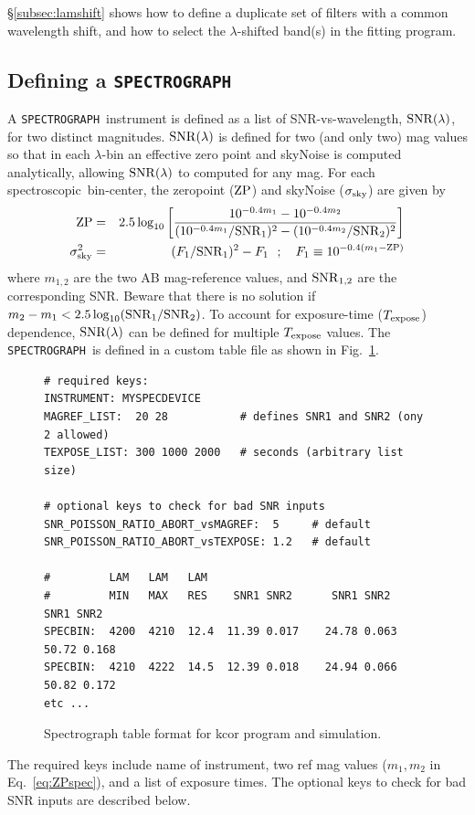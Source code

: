 \documentclass[12pt]{article}
\newcommand{\SPEC}{{\tt SPECTROGRAPH}}
\newcommand{\SNRlam}{{\rm SNR}(\lambda)}
\newcommand{\Texpose}{T_{\rm expose}}
\newcommand{\ZP}{{\rm ZP}}
\newcommand{\sigSky}{\sigma_{\rm sky}}
\newcommand{\spec}{spectroscopic}
\newcommand{\lam}{\lambda}
\begin{document}
{\S\ref{subsec:lamshift} shows how to define a duplicate set
of filters with a common wavelength shift, and how to select
the $\lambda$-shifted band(s) in the fitting program.


 \clearpage
\subsection{Defining a {\SPEC} }
\label{subsec:kcor_spectrograph}


A \SPEC\ instrument is defined as a list of SNR-vs-wavelength,
$\SNRlam$, for two distinct magnitudes. 
$\SNRlam$ is defined for two (and only two) mag values so that in each
$\lam$-bin an effective zero point and skyNoise is 
computed analytically, allowing $\SNRlam$ to computed for any mag.
For each \spec\ bin-center, the zeropoint ($\ZP$) and skyNoise ($\sigSky$) 
are given by
%
\begin{eqnarray}
   \ZP & = &
      2.5\log_{10}\left[ \frac{  10^{-0.4m_1} - 10^{-0.4m_2} }
           {  (10^{-0.4m_1}/{\rm SNR}_1)^2 - (10^{-0.4m_2}/{\rm SNR}_2)^2 }
      \right]
     \\
   \sigSky^2 & = & (F_1/{\rm SNR}_1)^2 - F_1 ~~ ; ~~~ 
            F_1 \equiv 10^{-0.4(m_1-\ZP)}
  \label{eq:ZPspec}
\end{eqnarray}
%
where $m_{1,2}$ are the two AB mag-reference values,
and ${\rm SNR}_{1,2}$ are the corresponding SNR.
Beware that there is no solution if
$m_2-m_1 < 2.5\log_{10}({\rm SNR}_1/{\rm SNR}_2)$.
%
To account for exposure-time ($\Texpose$) dependence, 
$\SNRlam$ can be defined for multiple $\Texpose$ values.
The \SPEC\ is defined in a custom table file as shown 
in Fig.~\ref{fig:spectro_table}.
%
\begin{figure} [ht] 
\begin{center}
\begin{Verbatim}[frame=single]
# required keys:
INSTRUMENT: MYSPECDEVICE
MAGREF_LIST:  20 28           # defines SNR1 and SNR2 (ony 2 allowed)
TEXPOSE_LIST: 300 1000 2000   # seconds (arbitrary list size)

# optional keys to check for bad SNR inputs
SNR_POISSON_RATIO_ABORT_vsMAGREF:  5     # default
SNR_POISSON_RATIO_ABORT_vsTEXPOSE: 1.2   # default

#         LAM   LAM   LAM
#         MIN   MAX   RES    SNR1 SNR2      SNR1 SNR2      SNR1 SNR2
SPECBIN:  4200  4210  12.4  11.39 0.017    24.78 0.063    50.72 0.168   
SPECBIN:  4210  4222  14.5  12.39 0.018    24.94 0.066    50.82 0.172   
etc ...
\end{Verbatim}
\end{center}
\caption{
  Spectrograph table format for kcor program and simulation.
 }
\label{fig:spectro_table}
\end{figure}
%
The required keys include name of instrument,
two ref mag values ($m_1,m_2$ in Eq.~\ref{eq:ZPspec}),
and a list of exposure times. The optional keys to 
check for bad SNR inputs are described below.

}
\end{document}
